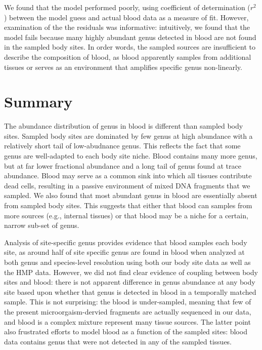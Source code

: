 We found that the model performed poorly, using coefficient of determination ($r^2$) between the model guess and actual blood data as a measure of fit. However, examination of the the residuals was informative: intuitively, we found that the model fails because many highly abundant genus detected in blood are not found in the sampled body sites. In order words, the sampled sources are insufficient to describe the composition of blood, as blood apparently samples from additional tissues or serves as an environment that amplifies specific genus non-linearly.

\section{Summary}

The abundance distribution of genus in blood is different than sampled body sites. Sampled body sites are dominated by few genus at high abundance with a relatively short tail of low-abudnance genus. This reflects the fact that some genus are well-adapted to each body site niche. Blood contains many more genus, but at far lower fractional abundance and a long tail of genus found at trace abundance. Blood may serve as a common sink into which all tissues contribute dead cells, resulting in a passive environment of mixed DNA fragments that we sampled. We also found that most abundant genus in blood are essentially absent from sampled body sites. This suggests that either that blood can samples from more sources (e.g., internal tissues) or that blood may be a niche for a certain, narrow sub-set of genus. 

Analysis of site-specific genus provides evidence that blood samples each body site, as around half of site specific genus are found in blood when analyzed at both genus and species-level resolution using both our body site data as well as the HMP data. However, we did not find clear evidence of coupling between body sites and blood: there is not apparent difference in genus abundance at any body site based upon whether that genus is detected in blood in a temporally matched sample. This is not surprising: the blood is under-sampled, meaning that few of the present microorgaism-dervied fragments are actually sequenced in our data, and blood is a complex mixture represent many tissue sources. The latter point also frustrated efforts to model blood as a function of the sampled sites: blood data contains genus that were not detected in any of the sampled tissues. 
